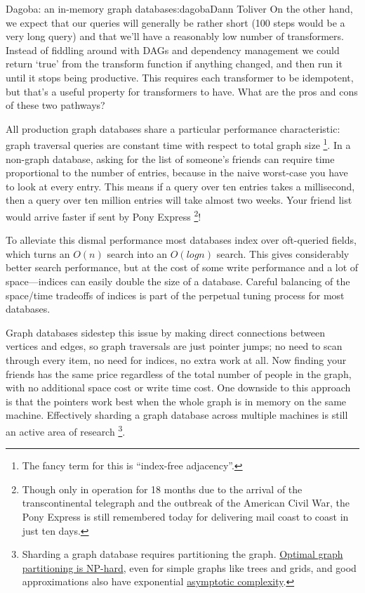 \begin{aosachapter}{Dagoba: an in-memory graph database}{s:dagoba}{Dann Toliver}
On the other hand, we expect that our queries will generally be rather
short (100 steps would be a very long query) and that we'll have a
reasonably low number of transformers. Instead of fiddling around with
DAGs and dependency management we could return `true' from the transform
function if anything changed, and then run it until it stops being
productive. This requires each transformer to be idempotent, but that's
a useful property for transformers to have. What are the pros and cons
of these two pathways?

\label{performance}

All production graph databases share a particular performance
characteristic: graph traversal queries are constant time with respect
to total graph size \footnote{The fancy term for this is ``index-free
  adjacency''.}. In a non-graph database, asking for the list of
someone's friends can require time proportional to the number of
entries, because in the naive worst-case you have to look at every
entry. This means if a query over ten entries takes a millisecond, then
a query over ten million entries will take almost two weeks. Your friend
list would arrive faster if sent by Pony Express \footnote{Though only
  in operation for 18 months due to the arrival of the transcontinental
  telegraph and the outbreak of the American Civil War, the Pony Express
  is still remembered today for delivering mail coast to coast in just
  ten days.}!

To alleviate this dismal performance most databases index over
oft-queried fields, which turns an $O(n)$ search into an $O(log n)$
search. This gives considerably better search performance, but at the
cost of some write performance and a lot of space---indices can easily
double the size of a database. Careful balancing of the space/time
tradeoffs of indices is part of the perpetual tuning process for most
databases.

Graph databases sidestep this issue by making direct connections between
vertices and edges, so graph traversals are just pointer jumps; no need
to scan through every item, no need for indices, no extra work at all.
Now finding your friends has the same price regardless of the total
number of people in the graph, with no additional space cost or write
time cost. One downside to this approach is that the pointers work best
when the whole graph is in memory on the same machine. Effectively
sharding a graph database across multiple machines is still an active
area of research \footnote{Sharding a graph database requires
  partitioning the graph.
  \href{http://dl.acm.org/citation.cfm?doid=1007912.1007931}{Optimal
  graph partitioning is NP-hard}, even for simple graphs like trees and
  grids, and good approximations also have exponential
  \href{http://arxiv.org/pdf/1311.3144v2.pdf}{asymptotic complexity}.}.


\end{aosachapter}
